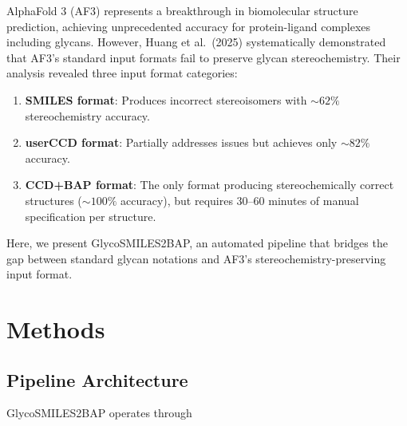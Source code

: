 \documentclass[11pt,a4paper]{article}
\begin{document}
AlphaFold 3 (AF3) represents a breakthrough in biomolecular structure prediction, achieving unprecedented accuracy for protein-ligand complexes including glycans. However, Huang et al.\ (2025) systematically demonstrated that AF3's standard input formats fail to preserve glycan stereochemistry. Their analysis revealed three input format categories:

\begin{enumerate}
\item \textbf{SMILES format}: Produces incorrect stereoisomers with ${\sim}62\%$ stereochemistry accuracy.
\item \textbf{userCCD format}: Partially addresses issues but achieves only ${\sim}82\%$ accuracy.
\item \textbf{CCD+BAP format}: The only format producing stereochemically correct structures (${\sim}100\%$ accuracy), but requires 30--60 minutes of manual specification per structure.
\end{enumerate}

Here, we present GlycoSMILES2BAP, an automated pipeline that bridges the gap between standard glycan notations and AF3's stereochemistry-preserving input format.

\section{Methods}

\subsection{Pipeline Architecture}

GlycoSMILES2BAP operates through
\end{document}
